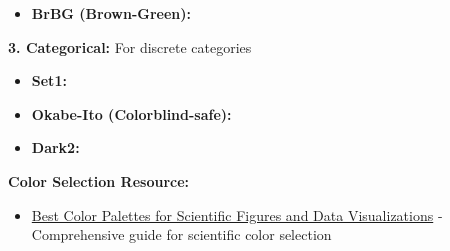 \documentclass[11pt,a4paper]{article}
\begin{document}
\begin{tcolorbox}[colback=blue!5,colframe=blue!50,title={\faPalette~Professional Color Palettes}]
\begin{itemize}
    \item \textbf{BrBG (Brown-Green):} 
    \colorbox[HTML]{543005}{\phantom{XX}}
    \colorbox[HTML]{8c510a}{\phantom{XX}}
    \colorbox[HTML]{bf812d}{\phantom{XX}}
    \colorbox[HTML]{dfc27d}{\phantom{XX}}
    \colorbox[HTML]{f6e8c3}{\phantom{XX}}
    \colorbox[HTML]{c7eae5}{\phantom{XX}}
    \colorbox[HTML]{80cdc1}{\phantom{XX}}
    \colorbox[HTML]{35978f}{\phantom{XX}}
    \colorbox[HTML]{01665e}{\phantom{XX}}
    \colorbox[HTML]{003c30}{\phantom{XX}}
\end{itemize}

\textbf{3. Categorical:} For discrete categories

\begin{itemize}
    \item \textbf{Set1:} 
    \colorbox[HTML]{e41a1c}{\phantom{XX}}
    \colorbox[HTML]{377eb8}{\phantom{XX}}
    \colorbox[HTML]{4daf4a}{\phantom{XX}}
    \colorbox[HTML]{984ea3}{\phantom{XX}}
    \colorbox[HTML]{ff7f00}{\phantom{XX}}
    \colorbox[HTML]{ffff33}{\phantom{XX}}
    \colorbox[HTML]{a65628}{\phantom{XX}}
    \colorbox[HTML]{f781bf}{\phantom{XX}}
    \colorbox[HTML]{999999}{\phantom{XX}}
    
    \item \textbf{Okabe-Ito (Colorblind-safe):} 
    \colorbox[HTML]{E69F00}{\phantom{XX}}
    \colorbox[HTML]{56B4E9}{\phantom{XX}}
    \colorbox[HTML]{009E73}{\phantom{XX}}
    \colorbox[HTML]{F0E442}{\phantom{XX}}
    \colorbox[HTML]{0072B2}{\phantom{XX}}
    \colorbox[HTML]{D55E00}{\phantom{XX}}
    \colorbox[HTML]{CC79A7}{\phantom{XX}}
    \colorbox[HTML]{000000}{\phantom{XX}}
    
    \item \textbf{Dark2:} 
    \colorbox[HTML]{1b9e77}{\phantom{XX}}
    \colorbox[HTML]{d95f02}{\phantom{XX}}
    \colorbox[HTML]{7570b3}{\phantom{XX}}
    \colorbox[HTML]{e7298a}{\phantom{XX}}
    \colorbox[HTML]{66a61e}{\phantom{XX}}
    \colorbox[HTML]{e6ab02}{\phantom{XX}}
    \colorbox[HTML]{a6761d}{\phantom{XX}}
    \colorbox[HTML]{666666}{\phantom{XX}}
\end{itemize}
\end{tcolorbox}

\textbf{Color Selection Resource:}
\begin{itemize}
    \item \href{https://www.simplifiedsciencepublishing.com/resources/best-color-palettes-for-scientific-figures-and-data-visualizations}{Best Color Palettes for Scientific Figures and Data Visualizations} - Comprehensive guide for scientific color selection
\end{itemize}
\end{document}
